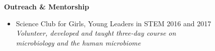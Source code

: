 \documentclass[10pt]{article}
\renewcommand{\section}[1]{\pagebreak[3]%
    \hyphenpenalty=10000%
    \vspace{1.3\baselineskip}%
    \phantomsection\addcontentsline{toc}{section}{#1}%
    \noindent\llap{\scshape\smash{\parbox[t]{\marginparwidth}{\raggedright #1}}}%
    \vspace{-\baselineskip}\par}
\newenvironment{outerlist}[1][\enskip\textbullet]%
        {\begin{itemize}[#1,leftmargin=*]}{\end{itemize}%
         \vspace{-.6\baselineskip}}
\begin{document}
\textbf{Outreach \& Mentorship}
\begin{outerlist}

	\item[] Science Club for Girls, Young Leaders in STEM \hfill {2016 and 2017} \\ \textit{Volunteer, developed and taught three-day course on} \\ \textit{microbiology and the human microbiome} 
\end{outerlist}
\vspace{.15in}


%
\end{document}

